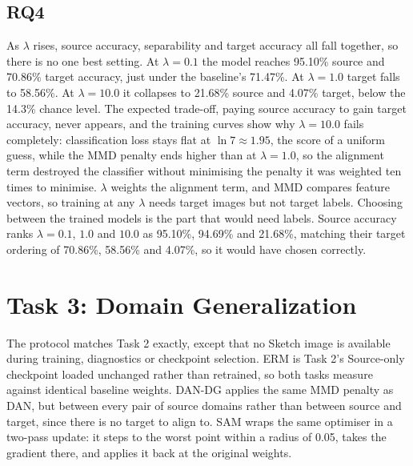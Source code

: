 \documentclass{article}
\begin{document}
\subsection{RQ4}

As $\lambda$ rises, source accuracy, separability and target accuracy all
fall together, so there is no one best setting. At $\lambda = 0.1$ the model
reaches 95.10\% source and 70.86\% target accuracy, just under the baseline's
71.47\%. At $\lambda = 1.0$ target falls to 58.56\%. At $\lambda = 10.0$ it
collapses to 21.68\% source and 4.07\% target, below the 14.3\% chance level.
The expected trade-off, paying source accuracy to gain target accuracy, never
appears, and the training curves show why $\lambda = 10.0$ fails completely:
classification loss stays flat at $\ln 7 \approx 1.95$, the score of a
uniform guess, while the MMD penalty ends higher than at $\lambda = 1.0$, so
the alignment term destroyed the classifier without minimising the penalty it
was weighted ten times to minimise. $\lambda$ weights the alignment term, and
MMD compares feature vectors, so training at any $\lambda$ needs target
images but not target labels. Choosing between the trained models is the part
that would need labels. Source accuracy ranks $\lambda = 0.1$, $1.0$ and
$10.0$ as 95.10\%, 94.69\% and 21.68\%, matching their target ordering of
70.86\%, 58.56\% and 4.07\%, so it would have chosen correctly.

\section{Task 3: Domain Generalization}
\label{sec:task3}

The protocol matches Task 2 exactly, except that no Sketch image is available
during training, diagnostics or checkpoint selection. ERM is Task 2's
Source-only checkpoint loaded unchanged rather than retrained, so both tasks
measure against identical baseline weights. DAN-DG applies the same MMD
penalty as DAN, but between every pair of source domains rather than between
source and target, since there is no target to align to. SAM wraps the same
optimiser in a two-pass update: it steps to the worst point within a radius
of 0.05, takes the gradient there, and applies it back at the original
weights.
\end{document}
